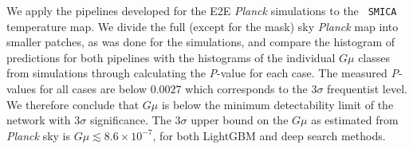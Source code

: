 \documentclass[fleqn,usenatbib]{mnras}
\begin{document}
We apply the pipelines developed for the E2E {\it Planck} simulations to the \texttt{ SMICA} temperature map.
We divide the full (except for the mask) sky {\it Planck} map into smaller patches, as was done for the simulations, and 
compare the histogram of predictions for both pipelines with the histograms of the individual $G\mu$ classes from simulations through calculating the {\it P}-value for each case. The measured {\it P}-values for all cases are below  $0.0027$ which corresponds to the $3\sigma$ frequentist level.
We therefore conclude that $G\mu$ is below the minimum detectability limit of the network with $3\sigma$ significance.  The $3\sigma$ upper bound on the  $G\mu$ as estimated from  {\it Planck} sky is $G\mu \lesssim 8.6 \times 10^{-7}$, for both LightGBM and deep search methods.
\iffalse 
\begin{equation}\label{eq:finlgbm}
G\mu \lesssim 8.6 \times 10^{-7}  ~~~(3\sigma)
\end{equation}  
for both LightGBM and deep search methods. }
\fi
\iffalse
\begin{equation}\label{eq:fincnn}
G\mu \lesssim 8.6  \times 10^{-7} ~~~(3\sigma)
\end{equation}  
for the deep search.
\fi
\end{document}
